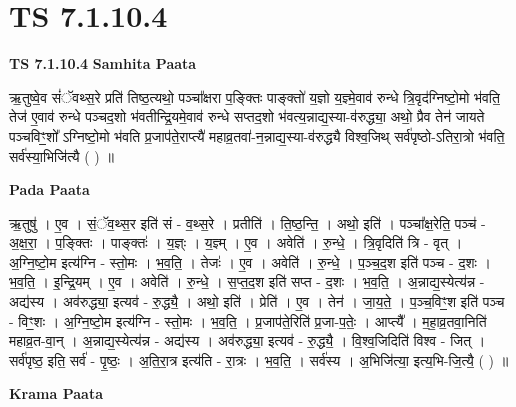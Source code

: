 \documentclass[17pt]{extarticle}
\begin{document}
\section{ TS 7.1.10.4 }

\textbf{TS 7.1.10.4 } \newline
\textbf{Samhita Paata} \newline

ऋ॒तुष्वे॒व सं॑ॅवथ्स॒रे प्रति॑ तिष्ठ॒त्यथो॒ पञ्चा᳚क्षरा प॒ङ्क्तिः पाङ्क्तो॑ य॒ज्ञो य॒ज्ञ्मे॒वाव॑ रुन्धे त्रि॒वृद॑ग्निष्टो॒मो भ॑वति॒ तेज॑ ए॒वाव॑ रुन्धे पञ्चद॒शो भ॑वतीन्द्रि॒यमे॒वाव॑ रुन्धे सप्तद॒शो भ॑वत्य॒न्नाद्य॒स्या-व॑रुद्ध्या॒ अथो॒ प्रैव तेन॑ जायते पञ्चविꣳ॒॒शो᳚ ऽग्निष्टो॒मो भ॑वति प्र॒जाप॑ते॒राप्त्यै॑ महाव्र॒तवा॑-न॒न्नाद्य॒स्या-व॑रुद्ध्यै विश्व॒जिथ् सर्व॑पृष्ठो-ऽतिरा॒त्रो भ॑वति॒ सर्व॑स्या॒भिजि॑त्यै ( ) ॥ \newline

\textbf{Pada Paata} \newline

ऋ॒तुषु॑ । ए॒व । सं॒ॅव॒थ्स॒र इति॑ सं - व॒थ्स॒रे । प्रतीति॑ । ति॒ष्ठ॒न्ति॒ । अथो॒ इति॑ । पञ्चा᳚क्ष॒रेति॒ पञ्च॑ - अ॒क्ष॒रा॒ । प॒ङ्क्तिः । पाङ्क्तः॑ । य॒ज्ञ्ः । य॒ज्ञ्म् । ए॒व । अवेति॑ । रु॒न्धे॒ । त्रि॒वृदिति॑ त्रि - वृत् । अ॒ग्नि॒ष्टो॒म इत्य॑ग्नि - स्तो॒मः । भ॒व॒ति॒ । तेजः॑ । ए॒व । अवेति॑ । रु॒न्धे॒ । प॒ञ्च॒द॒श इति॑ पञ्च - द॒शः । भ॒व॒ति॒ । इ॒न्द्रि॒यम् । ए॒व । अवेति॑ । रु॒न्धे॒ । स॒प्त॒द॒श इति॑ सप्त - द॒शः । भ॒व॒ति॒ । अ॒न्नाद्य॒स्येत्य॑न्न - अद्य॑स्य । अव॑रुद्ध्या॒ इत्यव॑ - रु॒द्ध्यै॒ । अथो॒ इति॑ । प्रेति॑ । ए॒व । तेन॑ । जा॒य॒ते॒ । प॒ञ्च॒विꣳ॒॒श इति॑ पञ्च - विꣳ॒॒शः । अ॒ग्नि॒ष्टो॒म इत्य॑ग्नि - स्तो॒मः । भ॒व॒ति॒ । प्र॒जाप॑ते॒रिति॑ प्र॒जा-प॒तेः॒ । आप्त्यै᳚ । म॒हा॒व्र॒तवा॒निति॑ महाव्र॒त-वा॒न् । अ॒न्नाद्य॒स्येत्य॑न्न - अद्य॑स्य । अव॑रुद्ध्या॒ इत्यव॑ - रु॒द्ध्यै॒ । वि॒श्व॒जिदिति॑ विश्व - जित् । सर्व॑पृष्ठ॒ इति॒ सर्व॑ - पृ॒ष्ठः॒ । अ॒ति॒रा॒त्र इत्य॑ति - रा॒त्रः । भ॒व॒ति॒ । सर्व॑स्य । अ॒भिजि॑त्या॒ इत्य॒भि-जि॒त्यै॒ ( ) ॥  \newline


\textbf{Krama Paata} \newline
\end{document}

